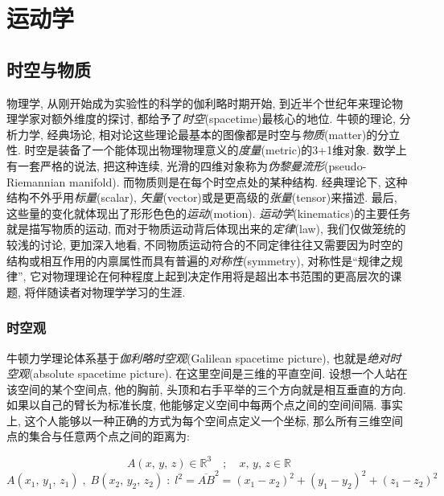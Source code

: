 \chapter{运动学}\label{2}


\section{时空与物质}\label{2-1}

物理学, 从刚开始成为实验性的科学的伽利略时期开始, 到近半个世纪年来理论物理学家对额外维度的探讨, 都给予了\emph{时空}(spacetime)最核心的地位. 牛顿的理论, 分析力学, 经典场论, 相对论这些理论最基本的图像都是时空与\emph{物质}(matter)的分立性. 时空是装备了一个能体现出物理物理意义的\emph{度量}(metric)的3+1维对象. 数学上有一套严格的说法, 把这种连续, 光滑的四维对象称为\emph{伪黎曼流形}(pseudo-Riemannian manifold). 而物质则是在每个时空点处的某种结构. 经典理论下, 这种结构不外乎用\emph{标量}(scalar), \emph{矢量}(vector)或是更高级的\emph{张量}(tensor)来描述. 最后, 这些量的变化就体现出了形形色色的\emph{运动}(motion). \emph{运动学}(kinematics)的主要任务就是描写物质的运动, 而对于物质运动背后体现出来的\emph{定律}(law), 我们仅做笼统的较浅的讨论, 更加深入地看, 不同物质运动符合的不同定律往往又需要因为时空的结构或相互作用的内禀属性而具有普遍的\emph{对称性}(symmetry), 对称性是``规律之规律'', 它对物理理论在何种程度上起到决定作用将是超出本书范围的更高层次的课题, 将伴随读者对物理学学习的生涯.

\subsection{时空观}\label{2-1-1}

牛顿力学理论体系基于\emph{伽利略时空观}(Galilean spacetime picture), 也就是\emph{绝对时空观}(absolute spacetime picture). 在这里空间是三维的平直空间. 设想一个人站在该空间的某个空间点, 他的胸前, 头顶和右手平举的三个方向就是相互垂直的方向. 如果以自己的臂长为标准长度, 他能够定义空间中每两个点之间的空间间隔. 事实上, 这个人能够以一种正确的方式为每个空间点定义一个坐标, 那么所有三维空间点的集合与任意两个点之间的距离为:

\[A(x,\,y,\,z)\in\mathbb{R}^3 \quad;\quad x,\,y,\,z\in\mathbb{R}\]
\[A(x_1,\,y_1,\,z_1)\;,\;B(x_2,\,y_2,\,z_2)\;:\;l^2=\overline{AB}^2=(x_1-x_2)^2+(y_1-y_2)^2+(z_1-z_2)^2\]

